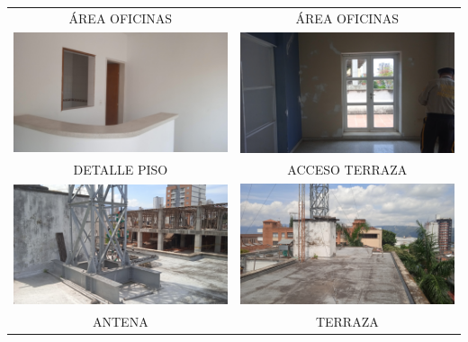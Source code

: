 \documentclass[12pt,a4paper,twoside]{article}
\begin{document}
\begin{tabular}{ c c }
ÁREA OFICINAS & ÁREA OFICINAS\\
	\includegraphics[width = 7 cm]{Imagenes/31} & \includegraphics[width = 7 cm]{Imagenes/32} \\
DETALLE PISO & ACCESO TERRAZA\\
	\includegraphics[width = 7 cm]{Imagenes/33} & \includegraphics[width = 7 cm]{Imagenes/34} \\
ANTENA & TERRAZA\\
\end{tabular}
\end{document}
